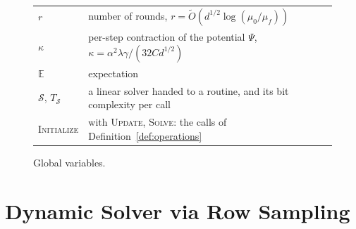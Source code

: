 \documentclass[11pt]{article}
\renewcommand{\O}{\widetilde O}
\newcommand{\E}{\mathbb E}
\begin{document}
\begin{figure}[H]
\begin{center}
\begin{tabular}{@{}ll@{}}
$r$ & number of rounds, $r = \O(d^{1/2}\log(\mu_0/\mu_f))$ \\
$\kappa$ & per-step contraction of the potential $\Psi$, $\kappa = \alpha^{2}\lambda\gamma/(32 C d^{1/2})$ \\
$\E$ & expectation \\
$\mathcal{S}$, $T_{\mathcal{S}}$ & a linear solver handed to a routine, and its bit complexity per call \\
\textsc{Initialize} & with \textsc{Update}, \textsc{Solve}: the calls of Definition~\ref{def:operations} \\
\bottomrule
\end{tabular}
\end{center}
\caption{Global variables.}
\label{fig:notation_global}
\end{figure}

\section{Dynamic Solver via Row Sampling}
\label{sec:dynamic}
\end{document}
